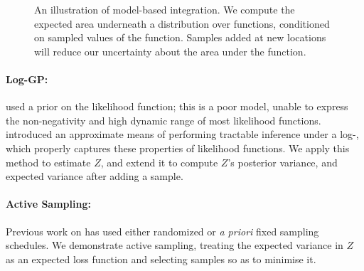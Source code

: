 \documentclass{article}
\begin{document}
\begin{figure}
\centering
{}
\caption{An illustration of model-based integration.  We compute the expected area underneath a distribution over functions, conditioned on sampled values of the function.  Samples added at new locations will reduce our uncertainty about the area under the function.}
\label{fig:model_based}
\end{figure}




\paragraph*{Log-GP:} \citet{BZMonteCarlo} used a \gpb prior on the likelihood function; this is a poor model, unable to express the non-negativity and high dynamic range of most likelihood functions. \citet{BQR} introduced an approximate means of performing tractable inference under a log-\gp, which properly captures these properties of likelihood functions. We apply this method to estimate $Z$, and extend it to compute $Z$'s posterior variance, and expected variance after adding a sample. 

\paragraph*{Active Sampling:} Previous work on  has used either randomized or {\it a priori} fixed sampling schedules. We demonstrate active sampling, treating the expected variance in $Z$ as an expected loss function and selecting samples so as to minimise it.

\end{document}
